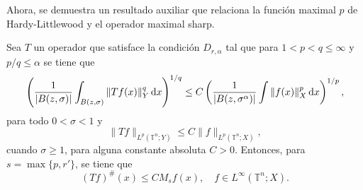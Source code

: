 Ahora, se demuestra un resultado auxiliar que relaciona la función maximal $p$ de Hardy-Littlewood y el operador maximal sharp.
\begin{theorem}
	Sea $T$ un operador que satisface la condición $D_{r,\alpha}$ tal que para $1<p<q\leq\infty$ y $p/q\leq\alpha$ se tiene que
	\begin{equation}
		\left( \frac{1}{|B(z, \sigma)|} \int_{B(z, \sigma)} \|Tf(x)\|_Y^q \mathop{}\!\mathrm{d} x  \right)^{1/q} \leq C \left( \frac{1}{|B(z, \sigma^\alpha)|} \int \|f(x)\|_X^p \mathop{}\!\mathrm{d} x  \right)^{1/p}, 
		\label{eq:c-p-q-alpha}
	\end{equation}
	para todo $0<\sigma<1$ y 
	\begin{equation*}
		\|Tf\|_{L^p(\mathbb{T}^n;Y)} \leq C \|f\|_{L^p(\mathbb{T}^n;X)},
	\end{equation*}
	cuando $\sigma\geq1$, para alguna constante absoluta $C>0$. Entonces, para $s=\max \{ p, r' \}$, se tiene que 
	\begin{equation}
		(Tf)^\#(x) \leq CM_sf(x), \quad f\in L^\infty (\mathbb{T}^n; X).
		\label{eq:Tf-Msf}
	\end{equation}
	\label{theo:Tf-Msf}
\end{theorem}

